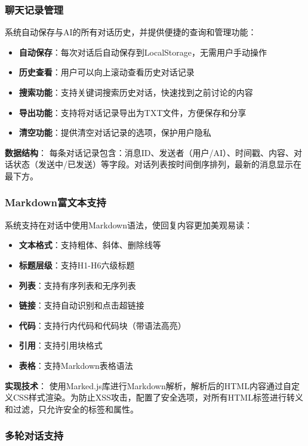 \documentclass[12pt,a4paper]{article}
\begin{document}
\subsubsection{聊天记录管理}

系统自动保存与AI的所有对话历史，并提供便捷的查询和管理功能：

\begin{itemize}
    \item \textbf{自动保存}：每次对话后自动保存到LocalStorage，无需用户手动操作
    \item \textbf{历史查看}：用户可以向上滚动查看历史对话记录
    \item \textbf{搜索功能}：支持关键词搜索历史对话，快速找到之前讨论的内容
    \item \textbf{导出功能}：支持将对话记录导出为TXT文件，方便保存和分享
    \item \textbf{清空功能}：提供清空对话记录的选项，保护用户隐私
\end{itemize}

\textbf{数据结构}：
每条对话记录包含：消息ID、发送者（用户/AI）、时间戳、内容、对话状态（发送中/已发送）等字段。对话列表按时间倒序排列，最新的消息显示在最下方。

\subsubsection{Markdown富文本支持}

系统支持在对话中使用Markdown语法，使回复内容更加美观易读：

\begin{itemize}
    \item \textbf{文本格式}：支持粗体、斜体、删除线等
    \item \textbf{标题层级}：支持H1-H6六级标题
    \item \textbf{列表}：支持有序列表和无序列表
    \item \textbf{链接}：支持自动识别和点击超链接
    \item \textbf{代码}：支持行内代码和代码块（带语法高亮）
    \item \textbf{引用}：支持引用块格式
    \item \textbf{表格}：支持Markdown表格语法
\end{itemize}

\textbf{实现技术}：
使用Marked.js库进行Markdown解析，解析后的HTML内容通过自定义CSS样式渲染。为防止XSS攻击，配置了安全选项，对所有HTML标签进行转义和过滤，只允许安全的标签和属性。

\subsubsection{多轮对话支持}
\end{document}
